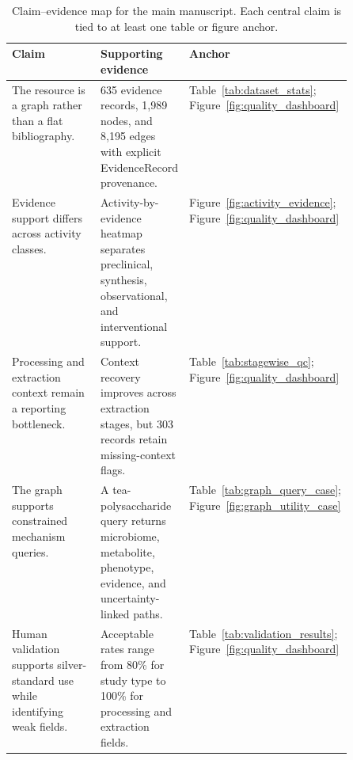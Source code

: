 \begin{table}[t]
\centering
\small
\caption{Claim--evidence map for the main manuscript. Each central claim is tied to at least one table or figure anchor.}
\label{tab:claim_evidence_map}
\begin{tabularx}{\linewidth}{p{0.28\linewidth}Xp{0.22\linewidth}}
\toprule
Claim & Supporting evidence & Anchor \\
\midrule
The resource is a graph rather than a flat bibliography. & 635 evidence records, 1,989 nodes, and 8,195 edges with explicit EvidenceRecord provenance. & Table~\ref{tab:dataset_stats}; Figure~\ref{fig:quality_dashboard} \\
Evidence support differs across activity classes. & Activity-by-evidence heatmap separates preclinical, synthesis, observational, and interventional support. & Figure~\ref{fig:activity_evidence}; Figure~\ref{fig:quality_dashboard} \\
Processing and extraction context remain a reporting bottleneck. & Context recovery improves across extraction stages, but 303 records retain missing-context flags. & Table~\ref{tab:stagewise_qc}; Figure~\ref{fig:quality_dashboard} \\
The graph supports constrained mechanism queries. & A tea-polysaccharide query returns microbiome, metabolite, phenotype, evidence, and uncertainty-linked paths. & Table~\ref{tab:graph_query_case}; Figure~\ref{fig:graph_utility_case} \\
Human validation supports silver-standard use while identifying weak fields. & Acceptable rates range from 80\% for study type to 100\% for processing and extraction fields. & Table~\ref{tab:validation_results}; Figure~\ref{fig:quality_dashboard} \\
\bottomrule
\end{tabularx}
\end{table}
